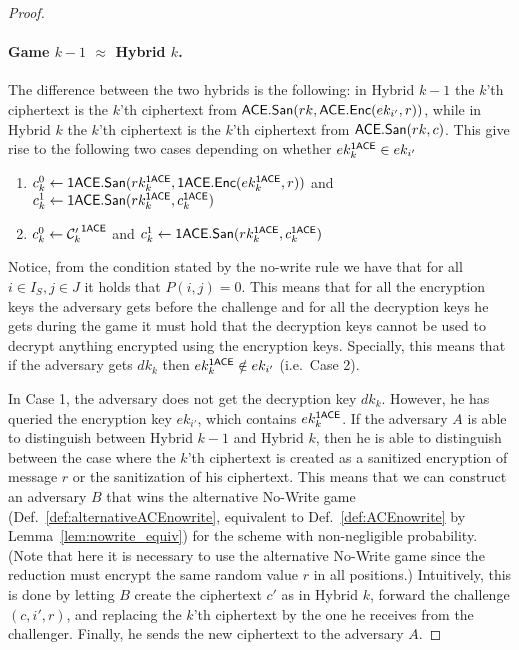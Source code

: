 \documentclass{llncs}
\begin{document}
\begin{proof}
\paragraph{Game $k-1$ $\approx$ Hybrid $k$.} The difference between the two hybrids is the following: in Hybrid $k-1$ the $k$'th \oACE ciphertext is the $k$'th ciphertext from $\mathsf{ACE}.\mathsf{San}(rk,\mathsf{ACE}.\mathsf{Enc}(ek_{i'},r))$, while in Hybrid $k$ the $k$'th \oACE ciphertext is the $k$'th ciphertext from $\mathsf{ACE}.\mathsf{San}(rk,c)$. 
This give rise to the following two cases depending on whether $ek_k^{\mathsf{1ACE}} \in ek_{i'}$
\begin{enumerate}
\item $c_k^0 \leftarrow \mathsf{1ACE}.\mathsf{San}(rk_k^{\mathsf{1ACE}},\mathsf{1ACE}.\mathsf{Enc}(ek_{k}^{\mathsf{1ACE}},r))$ \newline and $c_k^1 \leftarrow \mathsf{1ACE}.\mathsf{San}(rk_k^{\mathsf{1ACE}},c_k^{\mathsf{1ACE}})$
\item $c_k^0 \leftarrow {\mathcal{C}'_k}^{\mathsf{1ACE}}$ and $c_k^1 \leftarrow \mathsf{1ACE}.\mathsf{San}(rk_k^{\mathsf{1ACE}},c_k^{\mathsf{1ACE}})$
\end{enumerate}

Notice, from the condition stated by the no-write rule we have that for all $i \in I_S, j \in J$ it holds that $P(i,j) = 0$. This means that for all the encryption keys the adversary gets before the challenge and for all the decryption keys he gets during the game it must hold that the decryption keys cannot be used to decrypt anything encrypted using the encryption keys.
Specially, this means that if the adversary gets $dk_k$ then $ek_k^{\mathsf{1ACE}} \notin ek_{i'}$ (i.e.~Case 2).

In Case 1, the adversary does not get the decryption key $dk_k$. However, he has queried the encryption key $ek_{i'}$, which contains $ek_k^{\mathsf{1ACE}}$.
If the adversary $A$ is able to distinguish between Hybrid $k-1$ and Hybrid $k$, then he is able to distinguish between the case where the $k$'th \oACE ciphertext is created as a sanitized encryption of message $r$ or the sanitization of his ciphertext. This means that we can construct an adversary $B$ that wins the alternative No-Write game (Def.~\ref{def:alternativeACEnowrite}, equivalent to Def.~\ref{def:ACEnowrite} by Lemma~\ref{lem:nowrite_equiv}) for the \oACE scheme with non-negligible probability. (Note that here it is necessary to use the alternative No-Write game since the reduction must encrypt the same random value $r$ in all positions.) Intuitively, this is done by letting $B$ create the ciphertext $c'$ as in Hybrid $k$, forward the challenge $(c,i',r)$, and replacing the $k$'th \oACE ciphertext by the one he receives from the challenger. Finally, he sends the new ciphertext to the adversary $A$. 



\end{proof}
\end{document}
